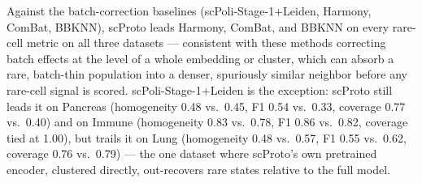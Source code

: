 Against the batch-correction baselines (scPoli-Stage-1+Leiden, Harmony, ComBat, BBKNN), scProto leads Harmony, ComBat, and BBKNN on every rare-cell metric on all three datasets --- consistent with these methods correcting batch effects at the level of a whole embedding or cluster, which can absorb a rare, batch-thin population into a denser, spuriously similar neighbor before any rare-cell signal is scored. scPoli-Stage-1+Leiden is the exception: scProto still leads it on Pancreas (homogeneity 0.48 vs.\ 0.45, F1 0.54 vs.\ 0.33, coverage 0.77 vs.\ 0.40) and on Immune (homogeneity 0.83 vs.\ 0.78, F1 0.86 vs.\ 0.82, coverage tied at 1.00), but trails it on Lung (homogeneity 0.48 vs.\ 0.57, F1 0.55 vs.\ 0.62, coverage 0.76 vs.\ 0.79) --- the one dataset where scProto's own pretrained encoder, clustered directly, out-recovers rare states relative to the full model.

